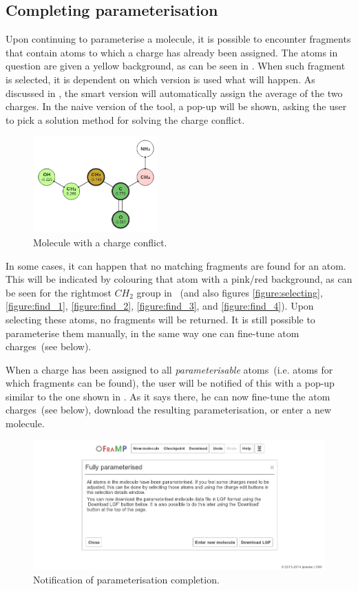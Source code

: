 \subsection{Completing parameterisation}
Upon continuing to parameterise a molecule, it is possible to encounter fragments that contain atoms to which a charge has already been assigned. The atoms in question are given a yellow background, as can be seen in . When such fragment is selected, it is dependent on which \oframp{} version is used what will happen. As discussed in , the smart version will automatically assign the average of the two charges. In the naive version of the tool, a pop-up will be shown, asking the user to pick a solution method for solving the charge conflict.

\begin{figure}
\center
\includegraphics[height=140px]{img/conflict.png}
\caption{Molecule with a charge conflict.}
\end{figure}

In some cases, it can happen that no matching fragments are found for an atom. This will be indicated by colouring that atom with a pink/red background, as can be seen for the rightmost $CH_{2}$ group in ~(and also figures \ref{figure:selecting}, \ref{figure:find_1}, \ref{figure:find_2}, \ref{figure:find_3}, and \ref{figure:find_4}). Upon selecting these atoms, no fragments will be returned. It is still possible to parameterise them manually, in the same way one can fine-tune atom charges~(see below).

When a charge has been assigned to all \emph{parameterisable} atoms~(i.e. atoms for which fragments can be found), the user will be notified of this with a pop-up similar to the one shown in . As it says there, he can now fine-tune the atom charges~(see below), download the resulting parameterisation, or enter a new molecule.

\begin{figure}
\center
\includegraphics[width=.9\textwidth]{img/finished.png}
\caption{Notification of parameterisation completion.}
\end{figure}


